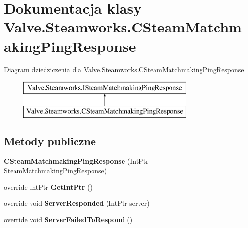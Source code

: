 \hypertarget{class_valve_1_1_steamworks_1_1_c_steam_matchmaking_ping_response}{}\section{Dokumentacja klasy Valve.\+Steamworks.\+C\+Steam\+Matchmaking\+Ping\+Response}
\label{class_valve_1_1_steamworks_1_1_c_steam_matchmaking_ping_response}
Diagram dziedziczenia dla Valve.\+Steamworks.\+C\+Steam\+Matchmaking\+Ping\+Response\begin{figure}[H]
\begin{center}
\leavevmode
\includegraphics[height=2.000000cm]{class_valve_1_1_steamworks_1_1_c_steam_matchmaking_ping_response}
\end{center}
\end{figure}
\subsection*{Metody publiczne}
\begin{DoxyCompactItemize}
\item 
\mbox{\label{class_valve_1_1_steamworks_1_1_c_steam_matchmaking_ping_response_ac57e34502d75c480e69d792eed1e46d9}} 
{\bfseries C\+Steam\+Matchmaking\+Ping\+Response} (Int\+Ptr Steam\+Matchmaking\+Ping\+Response)
\item 
\mbox{\label{class_valve_1_1_steamworks_1_1_c_steam_matchmaking_ping_response_a02a7e5fbedd2ba80ceb03daf7591a6ba}} 
override Int\+Ptr {\bfseries Get\+Int\+Ptr} ()
\item 
\mbox{\label{class_valve_1_1_steamworks_1_1_c_steam_matchmaking_ping_response_a12a44824fc2a99584cb25e6a79946402}} 
override void {\bfseries Server\+Responded} (Int\+Ptr server)
\item 
\mbox{\label{class_valve_1_1_steamworks_1_1_c_steam_matchmaking_ping_response_a87be6983376560ecd9395f96c4b2c388}} 
override void {\bfseries Server\+Failed\+To\+Respond} ()
\end{DoxyCompactItemize}


